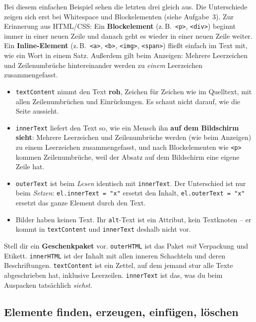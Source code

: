 \documentclass[a4paper,11pt]{article}
\begin{document}
Bei diesem einfachen Beispiel sehen die letzten drei gleich aus. Die Unterschiede zeigen sich erst bei
Whitespace und Blockelementen (siehe Aufgabe~3). Zur Erinnerung aus HTML/CSS: Ein \textbf{Blockelement}
(z.\,B.\ \texttt{<p>}, \texttt{<div>}) beginnt immer in einer neuen Zeile und danach geht es wieder in einer neuen
Zeile weiter. Ein \textbf{Inline-Element} (z.\,B.\ \texttt{<a>}, \texttt{<b>}, \texttt{<img>}, \texttt{<span>})
fließt einfach im Text mit, wie ein Wort in einem Satz. Außerdem gilt beim Anzeigen: Mehrere Leerzeichen und
Zeilenumbrüche hintereinander werden zu \emph{einem} Leerzeichen zusammengefasst.
\begin{itemize}[nosep]
\item \texttt{textContent} nimmt den Text \textbf{roh}, Zeichen für Zeichen wie im Quelltext, mit allen
      Zeilenumbrüchen und Einrückungen. Es schaut nicht darauf, wie die Seite aussieht.
\item \texttt{innerText} liefert den Text so, wie ein Mensch ihn \textbf{auf dem Bildschirm sieht}: Mehrere
      Leerzeichen und Zeilenumbrüche werden (wie beim Anzeigen) zu einem Leerzeichen zusammengefasst, und nach
      Blockelementen wie \texttt{<p>} kommen Zeilenumbrüche, weil der Absatz auf dem Bildschirm eine eigene Zeile hat.
\item \texttt{outerText} ist beim \emph{Lesen} identisch mit \texttt{innerText}. Der Unterschied ist nur beim
      \emph{Setzen}: \lstinline|el.innerText = "x"| ersetzt den Inhalt, \lstinline|el.outerText = "x"| ersetzt das
      ganze Element durch den Text.
\item Bilder haben keinen Text. Ihr \texttt{alt}-Text ist ein Attribut, kein Textknoten -- er kommt in
      \texttt{textContent} und \texttt{innerText} deshalb nicht vor.
\end{itemize}

\begin{analogie}
Stell dir ein \textbf{Geschenkpaket} vor. \texttt{outerHTML} ist das Paket \emph{mit} Verpackung und Etikett.
\texttt{innerHTML} ist der Inhalt mit allen inneren Schachteln und deren Beschriftungen. \texttt{textContent} ist
ein Zettel, auf dem jemand stur alle Texte abgeschrieben hat, inklusive Leerzeilen. \texttt{innerText} ist das, was
du beim Auspacken tatsächlich \emph{siehst}.
\end{analogie}

\subsection{Elemente finden, erzeugen, einfügen, löschen}\label{sec:finden}
\end{document}
